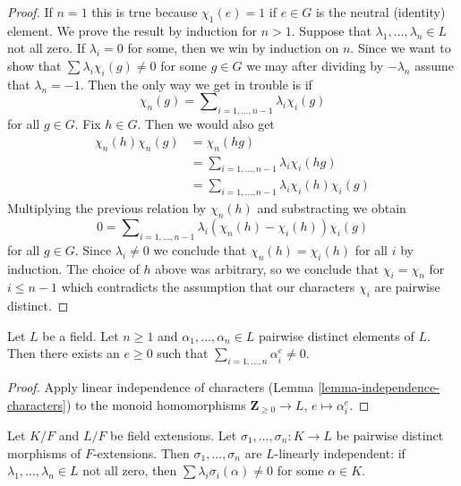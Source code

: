 \begin{proof}
If $n = 1$ this is true because $\chi_1(e) = 1$ if $e \in G$ is the
neutral (identity) element. We prove the result by induction for $n > 1$.
Suppose that $\lambda_1, \ldots, \lambda_n \in L$ not all zero.
If $\lambda_i = 0$ for some, then we win by induction on $n$.
Since we want to show that $\sum \lambda_i\chi_i(g) \not = 0$
for some $g \in G$ we may after dividing by $-\lambda_n$
assume that $\lambda_n = -1$. Then the only way we get in trouble
is if
$$
\chi_n(g) = \sum\nolimits_{i = 1, \ldots, n - 1} \lambda_i\chi_i(g)
$$
for all $g \in G$. Fix $h \in G$. Then we would also get
\begin{align*}
\chi_n(h)\chi_n(g) & = \chi_n(hg) \\
& = \sum\nolimits_{i = 1, \ldots, n - 1} \lambda_i\chi_i(hg) \\
& = \sum\nolimits_{i = 1, \ldots, n - 1} \lambda_i\chi_i(h) \chi_i(g)
\end{align*}
Multiplying the previous relation by $\chi_n(h)$ and substracting we obtain
$$
0 = \sum\nolimits_{i = 1, \ldots, n - 1}
\lambda_i (\chi_n(h) - \chi_i(h)) \chi_i(g)
$$
for all $g \in G$. Since $\lambda_i \not = 0$ we conclude that
$\chi_n(h) = \chi_i(h)$ for all $i$ by induction.
The choice of $h$ above was arbitrary, so we conclude
that $\chi_i = \chi_n$ for $i \leq n - 1$ which contradicts
the assumption that our characters $\chi_i$ are pairwise distinct.
\end{proof}

\begin{lemma}
\label{lemma-sums-of-powers}
Let $L$ be a field. Let $n \geq 1$ and $\alpha_1, \ldots, \alpha_n \in L$
pairwise distinct elements of $L$. Then there exists an
$e \geq 0$ such that $\sum_{i = 1, \ldots, n} \alpha_i^e \not = 0$.
\end{lemma}

\begin{proof}
Apply linear independence of characters
(Lemma \ref{lemma-independence-characters})
to the monoid homomorphisms $\mathbf{Z}_{\geq 0} \to L$,
$e \mapsto \alpha_i^e$.
\end{proof}

\begin{lemma}
\label{lemma-independence-embeddings}
Let $K/F$ and $L/F$ be field extensions. Let
$\sigma_1, \ldots, \sigma_n : K \to L$ be pairwise distinct
morphisms of $F$-extensions. Then $\sigma_1, \ldots, \sigma_n$
are $L$-linearly independent: if $\lambda_1, \ldots, \lambda_n \in L$
not all zero, then $\sum \lambda_i\sigma_i(\alpha) \not = 0$
for some $\alpha \in K$.
\end{lemma}

